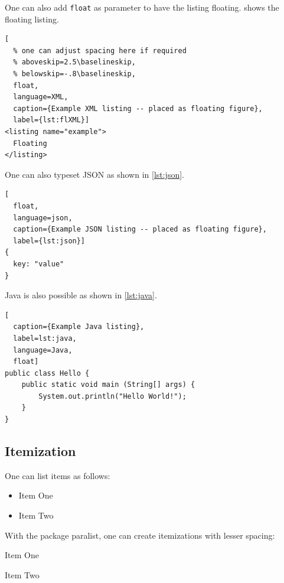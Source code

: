 \documentclass[conference,a4paper,english]{IEEEtran}[2015/08/26]
\begin{document}
One can also add \verb+float+ as parameter to have the listing floating.
 shows the floating listing.

\begin{ltgexample}
\begin{lstlisting}[
  % one can adjust spacing here if required
  % aboveskip=2.5\baselineskip,
  % belowskip=-.8\baselineskip,
  float,
  language=XML,
  caption={Example XML listing -- placed as floating figure},
  label={lst:flXML}]
<listing name="example">
  Floating
</listing>
\end{lstlisting}
\end{ltgexample}

One can also typeset JSON as shown in \cref{lst:json}.

\begin{ltgexample}
\begin{lstlisting}[
  float,
  language=json,
  caption={Example JSON listing -- placed as floating figure},
  label={lst:json}]
{
  key: "value"
}
\end{lstlisting}
\end{ltgexample}

Java is also possible as shown in \cref{lst:java}.

\begin{ltgexample}
\begin{lstlisting}[
  caption={Example Java listing},
  label=lst:java,
  language=Java,
  float]
public class Hello {
    public static void main (String[] args) {
        System.out.println("Hello World!");
    }
}
\end{lstlisting}
\end{ltgexample}

\subsection{Itemization}

One can list items as follows:

\begin{ltgexample}
\begin{itemize}
\item Item One
\item Item Two
\end{itemize}
\end{ltgexample}

With the package paralist, one can create itemizations with lesser spacing:

\begin{ltgexample}
\begin{compactitem}
\item Item One
\item Item Two
\end{compactitem}
\end{ltgexample}
\end{document}
